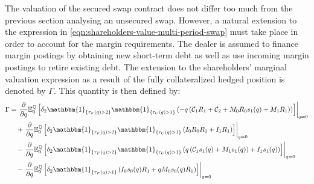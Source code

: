 \documentclass[main.tex]{subfiles}
\begin{document}
        The valuation of the secured swap contract does not differ too much from the previous section analysing an unsecured swap.
        However, a natural extension to the expression in \cref{eqn:shareholders-value-multi-period-swap}
        must take place in order to account for the margin requirements.
        The dealer is assumed to finance margin postings by obtaining new short-term debt
        as well as use incoming margin postings to retire existing debt.
        The extension to the shareholders' marginal valuation expression
        as a result of the fully collateralized hedged position is denoted by $\Gamma$.
        This quantity is then defined by:
        \begin{align}
            \Gamma &=
            \left.\frac{\partial}{\partial q}
            \mathbb{E}_{0}^{\rnmeasure}\left[
                \delta_2 \mathbbm{1}_{\{\tau_{F}(q)>2\}}
                \mathbbm{1}_{\{\tau_{C}(q)>1\}}
                \left(
                    - q\left(\mathcal{C}_1 R_1 + \mathcal{C}_2
                    + M_0 R_0 s_1(q)
                    + M_1 R_1\right)
                \right) 
            \right]\right\rvert_{q=0}
            \nonumber
            \\
            &\quad+
            \left.\frac{\partial}{\partial q}
            \mathbb{E}_{0}^{\rnmeasure}\left[
                \delta_2 \mathbbm{1}_{\{\tau_{F}(q)>2\}}
                \mathbbm{1}_{\{\tau_{C}(q)>1\}}
                \left(
                    I_0 R_0 R_1
                    + I_1 R_1
                \right) 
            \right]\right\rvert_{q=0}
            \nonumber
            \\
            &\quad-
            \left.\frac{\partial}{\partial q}
            \mathbb{E}_{0}^{\rnmeasure}\left[
                \delta_2 \mathbbm{1}_{\{\tau_{F}(q)>2\}}
                \mathbbm{1}_{\{\tau_{C}(q)>1\}}
                \left(
                    q\left(\mathcal{C}_{1} s_{1}(q)
                    + M_1 s_{1}(q)\right)
                    + I_1 s_{1}(q)
                \right)
            \right]\right\rvert_{q=0}
            \nonumber
            \\
            &\quad-
            \left.\frac{\partial}{\partial q}
            \mathbb{E}_{0}^{\rnmeasure}\left[
                \delta_2 \mathbbm{1}_{\{\tau_{F}(q)>1\}}
                \left(
                    I_0 s_{0}(q) R_{1}
                    + qM_0 s_{0}(q) R_{1}
                \right) 
            \right]\right\rvert_{q=0}
            \label{eqn:sharholders-value-hedged-swap-step-1}
        \end{align}
\end{document}
